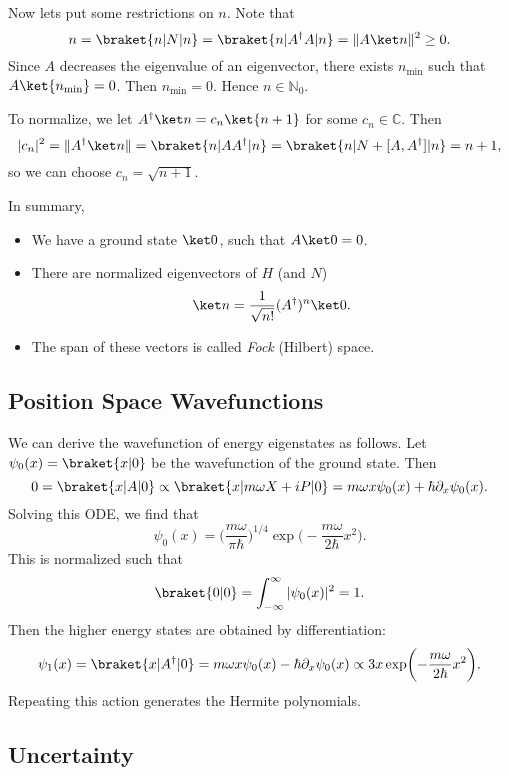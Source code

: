 \documentclass[12pt]{article}
\begin{document}
Now lets put some restrictions on $n$. Note that
\[
	n = \braket{n|N|n} = \braket{n|A^{\dagger}A|n} = \|A\ket n\|^2 \geq 0.
\]
Since $A$ decreases the eigenvalue of an eigenvector, there exists $n_{\min}$ such that $A \ket{n_{\min}} = 0$. Then $n_{\min} = 0$. Hence $n \in \mathbb{N}_0$.

To normalize, we let $A^{\dagger}\ket n = c_n \ket{n+1}$ for some $c_n \in \mathbb{C}$. Then
\[
	|c_n|^2 = \|A^{\dagger} \ket n\| = \braket{n|AA^{\dagger}|n} = \braket{n|N+[A,A^{\dagger}]|n}=n+1,
\]
so we can choose $c_n = \sqrt{n+1}$.

In summary,
\begin{itemize}
	\item We have a ground state $\ket 0$, such that $A \ket 0 = 0$.
	\item There are normalized eigenvectors of $H$ (and $N$)
		\[
			\ket n = \frac{1}{\sqrt{n!}} (A^{\dagger})^{n} \ket 0.
		\]
	\item The span of these vectors is called \emph{Fock} (Hilbert) space.
\end{itemize}


\subsection{Position Space Wavefunctions}
\label{sub:pos_wavefn}

We can derive the wavefunction of energy eigenstates as follows. Let $\psi_0(x) = \braket{x|0}$ be the wavefunction of the ground state. Then
\[
	0 = \braket{x|A|0} \propto \braket{x|m\omega X + i P|0} = m \omega x \psi_0(x) + \hbar \partial_x \psi_0(x).
\]
Solving this ODE, we find that
\[
\psi_0(x) = \biggl(\frac{m \omega}{\pi \hbar} \biggr)^{1/4} \exp \biggl( - \frac{m \omega}{2 \hbar} x^2 \biggr).
\]
This is normalized such that
\[
	\braket{0|0} = \int_{-\infty}^{\infty} |\psi_0(x)|^2 = 1.
\]
Then the higher energy states are obtained by differentiation:
\[
	\psi_1(x) = \braket{x|A^{\dagger}|0} = m \omega x \psi_0(x) - \hbar \partial_x \psi_0(x) \propto 3x \exp \biggl( - \frac{m \omega}{2\hbar} x^2 \biggr).
\]
Repeating this action generates the Hermite polynomials.

\subsection{Uncertainty}
\label{sub:uncertainty}
\end{document}
